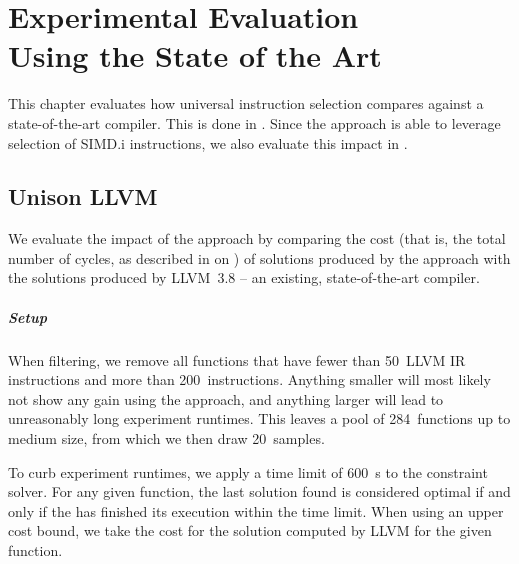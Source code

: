 %

\chapter[Experimental Evaluation Using the State of the Art]%
        {Experimental Evaluation\\ Using the State of the Art}

This chapter evaluates how \gls{universal instruction selection} compares
against a state-of-the-art \gls{compiler}.
%
This is done in .
%
Since the approach is able to leverage selection of \gls{SIMD.i}
\glspl{instruction}, we also evaluate this impact in
.


\section{Unison \versus LLVM}

We evaluate the impact of the approach by comparing the cost (that is, the total
number of cycles, as described in  on
) of \glspl{solution} produced by the
approach with the \glspl{solution} produced by \mbox{\gls{LLVM} 3.8} -- an
existing, state-of-the-art \gls{compiler}.


\paragraph{Setup}

When filtering, we remove all \glspl{function} that have fewer than
\num{50}~\gls{LLVM} \gls{IR} \glspl{instruction} and more than
\num{200}~\glspl{instruction}.
%
Anything smaller will most likely not show any gain using the approach, and
anything larger will lead to unreasonably long experiment runtimes.
%
This leaves a pool of \num{284}~\glspl{function} up to medium size, from which
we then draw \num{20}~samples.

To curb experiment runtimes, we apply a time limit of \SI{600}{\s} to the
\gls{constraint solver}.
%
For any given \gls{function}, the last \gls{solution} found is considered
optimal if and only if the  has finished its
execution within the time limit.
%
When using an upper cost bound, we take the cost for the \gls{solution} computed
by \gls{LLVM} for the given \gls{function}.


